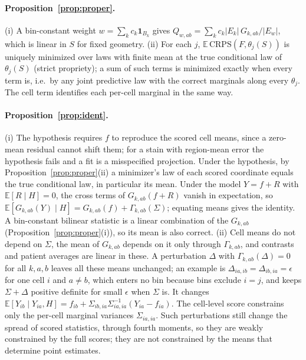 \documentclass[10pt,letterpaper]{article}
\theoremstyle{definition}
\theoremstyle{remark}
\newcommand{\E}{\mathbb{E}}
\begin{document}
\paragraph{Proposition~\ref{prop:proper}.} (i) A bin-constant weight $w=\sum_k c_k\mathbf{1}_{B_k}$ gives $Q_{w,ab}=\sum_k c_k|E_k|\,G_{k,ab}/|E_w|$, which is linear in $S$ for fixed geometry. (ii) For each $j$, $\E\,\mathrm{CRPS}(F,\theta_j(S))$ is uniquely minimized over laws with finite mean at the true conditional law of $\theta_j(S)$ (strict propriety); a sum of such terms is minimized exactly when every term is, i.e.\ by any joint predictive law with the correct marginals along every $\theta_j$. The cell term identifies each per-cell marginal in the same way.

\paragraph{Proposition~\ref{prop:ident}.} (i) The hypothesis requires $f$ to reproduce the scored cell means, since a zero-mean residual cannot shift them; for a stain with region-mean error the hypothesis fails and a fit is a misspecified projection. Under the hypothesis, by Proposition~\ref{prop:proper}(ii) a minimizer's law of each scored coordinate equals the true conditional law, in particular its mean. Under the model $Y=f+R$ with $\E[R\mid H]=0$, the cross terms of $G_{k,ab}(f+R)$ vanish in expectation, so $\E[G_{k,ab}(Y)\mid H]=G_{k,ab}(f)+\Gamma_{k,ab}(\Sigma)$; equating means gives the identity. A bin-constant bilinear statistic is a linear combination of the $G_{k,ab}$ (Proposition~\ref{prop:proper}(i)), so its mean is also correct. (ii) Cell means do not depend on $\Sigma$, the mean of $G_{k,ab}$ depends on it only through $\Gamma_{k,ab}$, and contrasts and patient averages are linear in these. A perturbation $\Delta$ with $\Gamma_{k,ab}(\Delta)=0$ for all $k,a,b$ leaves all these means unchanged; an example is $\Delta_{ia,ib}=\Delta_{ib,ia}=\epsilon$ for one cell $i$ and $a\ne b$, which enters no bin because bins exclude $i=j$, and keeps $\Sigma+\Delta$ positive definite for small $\epsilon$ when $\Sigma$ is. It changes $\E[Y_{ib}\mid Y_{ia},H]=f_{ib}+\Sigma_{ib,ia}\Sigma_{ia,ia}^{-1}(Y_{ia}-f_{ia})$. The cell-level score constrains only the per-cell marginal variances $\Sigma_{ia,ia}$. Such perturbations still change the spread of scored statistics, through fourth moments, so they are weakly constrained by the full scores; they are not constrained by the means that determine point estimates.
\end{document}
